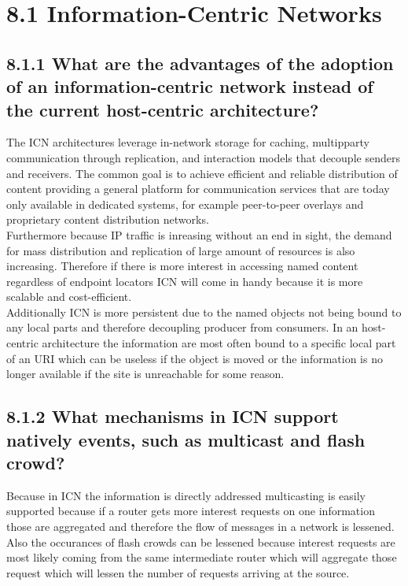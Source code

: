 \documentclass{article}
\begin{document}
	\pagestyle{fancy}
	
	\section*{8.1 Information-Centric Networks}
	\begin{adjustwidth}{2em}{2em}
		\subsection*{8.1.1 What are the advantages of the adoption of an information-centric network instead of the current host-centric architecture?}
		\begin{adjustwidth}{2em}{2em}
			The ICN architectures leverage in-network storage for caching, multipparty communication through replication, and interaction models that decouple senders and receivers. The common goal is to achieve efficient and reliable distribution of content providing a general platform for communication services that are today only available in dedicated systems, for example peer-to-peer overlays and proprietary content distribution networks. \\
			Furthermore because IP traffic is inreasing without an end in sight, the demand for mass distribution and replication of large amount of resources is also increasing. Therefore if there is more interest in accessing named content regardless of endpoint locators ICN will come in handy because it is more scalable and cost-efficient. \\
			Additionally ICN is more persistent due to the named objects not being bound to any local parts and therefore decoupling producer from consumers. In an host-centric architecture the information are most often bound to a specific local part of an URI which can be useless if the object is moved or the information is no longer available if the site is unreachable for some reason.
		\end{adjustwidth}
		\subsection*{8.1.2 What mechanisms in ICN support natively events, such as multicast and flash crowd?}
		\begin{adjustwidth}{2em}{2em}
			Because in ICN the information is directly addressed multicasting is easily supported because if a router gets more interest requests on one information those are aggregated and therefore the flow of messages in a network is lessened. Also the occurances of flash crowds can be lessened because interest requests are most likely coming from the same intermediate router which will aggregate those request which will lessen the number of requests arriving at the source.
		\end{adjustwidth}
	\end{adjustwidth}
	
\end{document}
